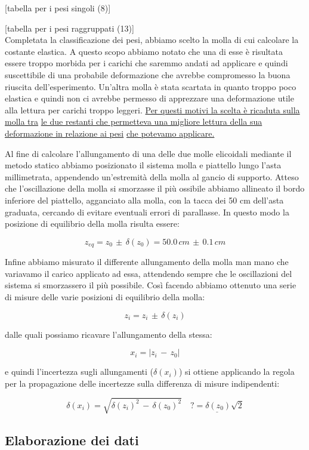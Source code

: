 [tabella per i pesi singoli (8)]

[tabella per i pesi raggruppati (13)]\\

Completata la classificazione dei pesi, abbiamo scelto la molla di cui calcolare la
costante elastica. A questo scopo abbiamo notato che una di esse è risultata essere troppo
morbida per i carichi che saremmo andati ad applicare e quindi suscettibile di una
probabile deformazione che avrebbe compromesso la buona riuscita dell'esperimento.
Un'altra molla è stata scartata in quanto troppo poco elastica e quindi non ci avrebbe permesso
di apprezzare una deformazione utile alla lettura per carichi troppo leggeri. \underline{Per questi motivi la scelta è ricaduta sulla molla tra}
\underline{le due restanti che permetteva una migliore lettura della sua deformazione in relazione ai pesi}
\break
\underline{che potevamo applicare.}

Al fine di calcolare l'allungamento di una delle due molle elicoidali mediante il metodo statico abbiamo posizionato il sistema molla e piattello lungo l'asta millimetrata, appendendo un'estremità della molla al gancio di supporto. Atteso che l'oscillazione della molla si smorzasse il più ossibile abbiamo allineato il bordo inferiore del piattello, agganciato alla molla, con la tacca dei 50 cm dell'asta graduata, cercando di evitare eventuali errori di parallasse. In questo modo la posizione di equilibrio della molla risulta essere:

\begin{equation}
	z_{eq} = z_0\,\pm\,\delta(z_0) = 50.0\,cm\,\pm\,0.1\,cm
\end{equation}

Infine abbiamo misurato il differente allungamento della molla man mano che variavamo il carico applicato ad essa, attendendo sempre che le oscillazioni del sistema si smorzassero il più possibile. Così facendo abbiamo ottenuto una serie di misure delle varie posizioni di equilibrio della molla:

\begin{equation}
	z_i = z_i\,\pm\,\delta(z_i) 
\end{equation}

dalle quali possiamo ricavare l'allungamento della stessa:

\begin{equation}
	x_i = |z_i\,-\,z_0|
\end{equation}

e quindi l’incertezza sugli allungamenti ($\delta(x_i)$) si ottiene applicando la regola per la propagazione delle incertezze sulla differenza di misure indipendenti:

\begin{equation}
	\delta(x_i) = \sqrt{\delta(z_i)^2\,-\,\delta(z_0)^2}
	\quad \underline{? = \delta(z_0)\sqrt{2}}
\end{equation}

\subsection{Elaborazione dei dati}
